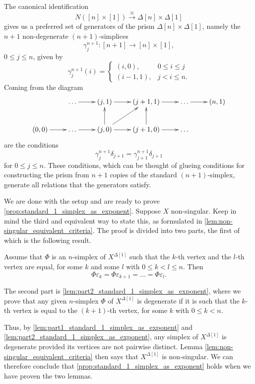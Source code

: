 The canonical identification
\[N([n]\times [1])\xrightarrow{\cong } \Delta [n]\times \Delta [1]\]
gives us a preferred set of generators of the prism $\Delta [n]\times \Delta [1]$, namely the $n+1$ non-degenerate
$(n+1)$-simplices
\[\gamma ^{n+1}_j:[n+1]\rightarrow [n]\times [1],\]
$0\leq j\leq n$,
given by
\begin{displaymath}
\gamma ^{n+1}_j(i)=
\begin{cases}
(i,0), & 0 \leq i \leq j \\ 
(i-1,1), & j < i \leq n.
\end{cases}
\end{displaymath}
Coming from the diagram
\begin{displaymath}
\xymatrix{
& \dots \ar[r] & (j,1) \ar[r] & (j+1,1) \ar[r] & \dots \ar[r] & (n,1) \\
(0,0) \ar[r] & \dots \ar[r] & (j,0) \ar[u] \ar[r] \ar[ur] & (j+1,0) \ar[r] \ar[u] & \dots
}
\end{displaymath}
are the conditions
\begin{equation}\label{Equation_generator_compatibility}
\gamma ^{n+1}_j\delta _{j+1}=\gamma ^{n+1}_{j+1}\delta _{j+1}
\end{equation}
for $0\leq j\leq n$. These conditions, which can be thought of glueing conditions for constructing the prism from $n+1$
copies of the standard $(n+1)$-simplex, generate all relations that the generators satisfy.

We are done with the setup and are ready to prove \cref{prop:standard_1_simplex_as_exponent}. Suppose $X$ non-singular. Keep in mind the third and equivalent way to state this, as formulated in \cref{lem:non-singular_equivalent_criteria}. The proof is divided into two parts, the first of which is the following result.
\begin{lemma}\label{lem:part1_standard_1_simplex_as_exponent}
Assume that $\Phi$ is an $n$-simplex of $X^{\Delta [1]}$ such that the $k$-th vertex and the $l$-th vertex are equal, for some $k$ and some $l$ with $0\leq k<l\leq n$. Then
\[\Phi \varepsilon _k=\Phi \varepsilon _{k+1}=\dots =\Phi \varepsilon _l.\]
\end{lemma}
\noindent The second part is \cref{lem:part2_standard_1_simplex_as_exponent}, where we prove that any given $n$-simplex $\Phi$ of $X^{\Delta [1]}$ is degenerate if it is such that the $k$-th vertex is equal to the $(k+1)$-th vertex, for some $k$ with $0\leq k<n$.

Thus, by \cref{lem:part1_standard_1_simplex_as_exponent} and \cref{lem:part2_standard_1_simplex_as_exponent}, any simplex of $X^{\Delta [1]}$ is degenerate provided its vertices are not pairwise distinct. Lemma \cref{lem:non-singular_equivalent_criteria} then says that $X^{\Delta [1]}$ is non-singular. We can therefore conclude that \cref{prop:standard_1_simplex_as_exponent} holds when we have proven the two lemmas.

